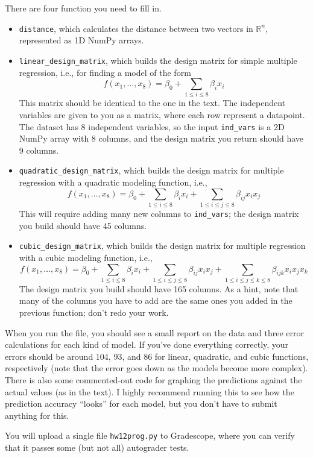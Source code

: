 \documentclass{article}
\theoremstyle{remark}
\newcommand{\R}{\mathbb R}
\begin{document}
There are four function you need to fill in.
\begin{itemize}
\item \texttt{distance}, which calculates the distance between two vectors in $\R^n$, represented as 1D NumPy arrays.
\item \texttt{linear\_design\_matrix}, which builds the design matrix for simple multiple regression, i.e., for finding a model of the form
  \begin{displaymath}
    f(x_1, \dots, x_8) = \beta_0 + \sum_{1 \leq i \leq 8} \beta_i x_i
  \end{displaymath}
  This matrix should be identical to the one in the text.
  The independent variables are given to you as a matrix, where each row represent a datapoint.
  The dataset has 8 independent variables, so the input \texttt{ind\_vars} is a 2D NumPy array with 8 columns, and the design matrix you return should have 9 columns.
\item \texttt{quadratic\_design\_matrix}, which builds the design matrix for multiple regression with a quadratic modeling function, i.e.,
  \begin{displaymath}
    f(x_1, \dots, x_8) = \beta_0 + \sum_{1 \leq i \leq 8} \beta_i x_i+ \sum_{1 \leq i \leq j \leq 8} \beta_{ij} x_ix_j
  \end{displaymath}
  This will require adding many new columns to \texttt{ind\_vars}; the design matrix you build should have 45 columns.
\item \texttt{cubic\_design\_matrix}, which builds the design matrix for multiple regression with a cubic modeling function, i.e.,
  \begin{displaymath}
    f(x_1, \dots, x_8) = \beta_0 + \sum_{1 \leq i \leq 8} \beta_i x_i + \sum_{1 \leq i \leq j \leq 8} \beta_{ij} x_ix_j + \sum_{1 \leq i \leq j \leq k \leq 8} \beta_{ijk} x_ix_jx_k
  \end{displaymath}
  The design matrix you build should have 165 columns.
  As a hint, note that many of the columns you have to add are the same ones you added in the previous function; don't redo your work.
\end{itemize}
When you run the file, you should see a small report on the data and three error calculations for each kind of model.
If you've done everything correctly, your errors should be around 104, 93, and 86 for linear, quadratic, and cubic functions, respectively (note that the error goes down as the models become more complex).
There is also some commented-out code for graphing the predictions against the actual values (as in the text).
I highly recommend running this to see how the prediction accuracy ``looks'' for each model, but you don't have to submit anything for this.

You will upload a single file \texttt{hw12prog.py} to Gradescope, where you can verify that it passes some (but not all) autograder tests.
\end{document}

